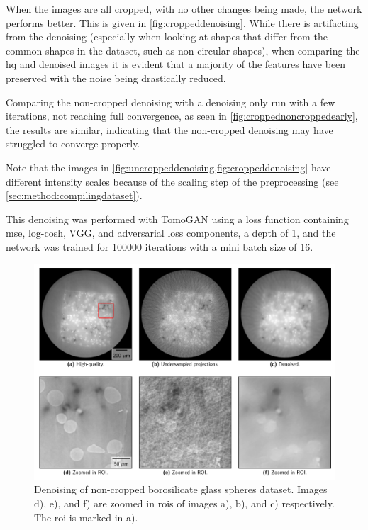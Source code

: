When the images are all cropped, with no other changes being made, the network performs better. This is given in \cref{fig:croppeddenoising}. While there is artifacting from the denoising (especially when looking at shapes that differ from the common shapes in the dataset, such as non-circular shapes), when comparing the \gls{hq} and denoised images it is evident that a majority of the features have been preserved with the noise being drastically reduced. 

Comparing the non-cropped denoising with a denoising only run with a few iterations, not reaching full convergence, as seen in \cref{fig:croppednoncroppedearly}, the results are similar, indicating that the non-cropped denoising may have struggled to converge properly. 

Note that the images in \cref{fig:uncroppeddenoising,fig:croppeddenoising} have different intensity scales because of the scaling step of the preprocessing (see \cref{sec:method:compilingdataset}). 

This denoising was performed with TomoGAN using a loss function containing \gls{mse}, log-cosh, VGG, and adversarial loss components, a depth of 1, and the network was trained for 100000 iterations with a mini batch size of 16. 

\begin{figure}[htbp]
  \centering
  \includegraphics[width=.9\textwidth]{figures/uncroppeddenoising.pdf}
  \caption[Non-cropped image denoising on the borosilicate glass spheres dataset]{Denoising of non-cropped borosilicate glass spheres dataset. Images d), e), and f) are zoomed in \gls{roi}s of images a), b), and c) respectively. The \gls{roi} is marked in a). }
  \label{fig:uncroppeddenoising}
\end{figure}

